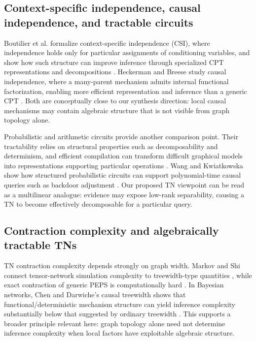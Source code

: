 \documentclass[11pt]{article}
\theoremstyle{remark}
\begin{document}
\subsection{Context-specific independence, causal independence, and tractable circuits}

Boutilier et al. formalize context-specific independence (CSI), where independence holds only for particular assignments of conditioning variables, and show how such structure can improve inference through specialized CPT representations and decompositions \cite{boutilier1996context}. Heckerman and Breese study causal independence, where a many-parent mechanism admits internal functional factorization, enabling more efficient representation and inference than a generic CPT \cite{heckerman1994causal}. Both are conceptually close to our synthesis direction: local causal mechanisms may contain algebraic structure that is not visible from graph topology alone.

Probabilistic and arithmetic circuits provide another comparison point. Their tractability relies on structural properties such as decomposability and determinism, and efficient compilation can transform difficult graphical models into representations supporting particular operations \cite{shen2016tractable}. Wang and Kwiatkowska show how structured probabilistic circuits can support polynomial-time causal queries such as backdoor adjustment \cite{wang2023compositional}. Our proposed TN viewpoint can be read as a multilinear analogue: evidence may expose low-rank separability, causing a TN to become effectively decomposable for a particular query.

\subsection{Contraction complexity and algebraically tractable TNs}

TN contraction complexity depends strongly on graph width. Markov and Shi connect tensor-network simulation complexity to treewidth-type quantities \cite{markov2008simulating}, while exact contraction of generic PEPS is computationally hard \cite{schuch2007complexity}. In Bayesian networks, Chen and Darwiche's causal treewidth shows that functional/deterministic mechanism structure can yield inference complexity substantially below that suggested by ordinary treewidth \cite{chen2022causal}. This supports a broader principle relevant here: graph topology alone need not determine inference complexity when local factors have exploitable algebraic structure.
\end{document}
